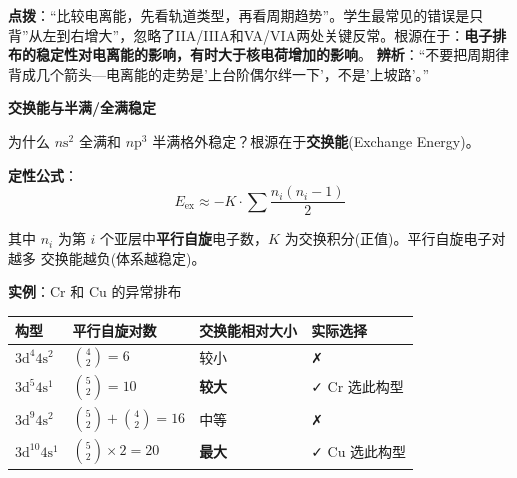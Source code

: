 \textbf{点拨}：``比较电离能，先看轨道类型，再看周期趋势''。学生最常见的错误是只背''从左到右增大''，忽略了IIA/IIIA和VA/VIA两处关键反常。根源在于：\textbf{电子排布的稳定性对电离能的影响，有时大于核电荷增加的影响}。
\textbf{辨析}：``不要把周期律背成几个箭头---电离能的走势是'上台阶偶尔绊一下'，不是'上坡路'。''

\textbf{交换能与半满/全满稳定}

为什么 \(n\mathrm{s}^2\) 全满和 \(n\mathrm{p}^3\) 半满格外稳定？根源在于\textbf{交换能}(Exchange Energy)。

\textbf{定性公式}：
\[E_{\text{ex}} \approx -K \cdot \sum \frac{n_i(n_i-1)}{2}\]

其中 \(n_i\) 为第 \(i\) 个亚层中\textbf{平行自旋}电子数，\(K\) 为交换积分(正值)。平行自旋电子对越多 \箭 交换能越负(体系越稳定)。

\textbf{实例}：Cr 和 Cu 的异常排布

{\def\LTcaptype{none} %
\begin{longtable}[]{@{}
  >{\centering\arraybackslash}p{}
  >{\centering\arraybackslash}p{}
  >{\centering\arraybackslash}p{}
  >{\centering\arraybackslash}p{}@{}}
\toprule\noalign{}
\begin{minipage}[b]{\linewidth}\centering
构型
\end{minipage} & \begin{minipage}[b]{\linewidth}\centering
平行自旋对数
\end{minipage} & \begin{minipage}[b]{\linewidth}\centering
交换能相对大小
\end{minipage} & \begin{minipage}[b]{\linewidth}\centering
实际选择
\end{minipage} \\
\midrule\noalign{}
\endhead
\bottomrule\noalign{}
\endlastfoot
\(3\mathrm{d}^4 4\mathrm{s}^2\) & \(\binom{4}{2}=6\) & 较小 & ✗ \\
\(3\mathrm{d}^5 4\mathrm{s}^1\) & \(\binom{5}{2}=10\) & \textbf{较大} & ✓ Cr 选此构型 \\
\(3\mathrm{d}^9 4\mathrm{s}^2\) & \(\binom{5}{2}+\binom{4}{2}=16\) & 中等 & ✗ \\
\(3\mathrm{d}^{10} 4\mathrm{s}^1\) & \(\binom{5}{2}\times2=20\) & \textbf{最大} & ✓ Cu 选此构型 \\
\end{longtable}
}

